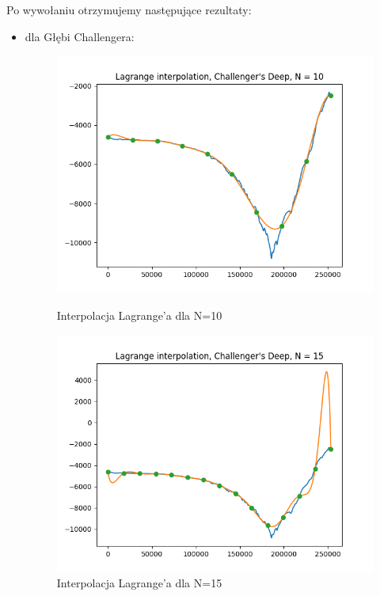 \documentclass{article}
\begin{document}
Po wywołaniu otrzymujemy następujące rezultaty:
\begin{itemize}
    
    \item dla Głębi Challengera:
    \begin{figure}[!htb]
      \includegraphics[width=\linewidth]{Challenger's_Deep_Lagrange_N_10.png}
      \caption{Interpolacja Lagrange'a dla N=10}
    \endminipage\hfill
      \includegraphics[width=\linewidth]{Challenger's_Deep_Lagrange_N_15.png}
      \caption{Interpolacja Lagrange'a dla N=15}
    \endminipage\hfill
    \end{figure}
    

\end{itemize}
\end{document}
